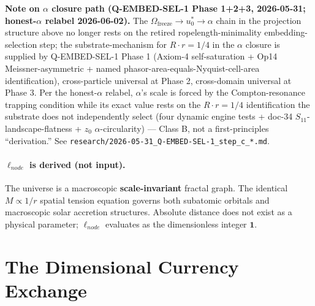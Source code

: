 \medskip
\noindent\textbf{Note on $\alpha$ closure path (Q-EMBED-SEL-1 Phase 1+2+3, 2026-05-31; honest-$\alpha$ relabel 2026-06-02).} The $\Omega_\text{freeze} \to u_0^* \to \alpha$ chain in the projection structure above no longer rests on the retired ropelength-minimality embedding-selection step; the substrate-mechanism for $R \cdot r = 1/4$ in the $\alpha$ closure is supplied by Q-EMBED-SEL-1 Phase 1 (Axiom-4 self-saturation + Op14 Meissner-asymmetric + named phasor-area-equals-Nyquist-cell-area identification), cross-particle universal at Phase 2, cross-domain universal at Phase 3. Per the honest-$\alpha$ relabel, $\alpha$'s scale is forced by the Compton-resonance trapping condition while its exact value rests on the $R \cdot r = 1/4$ identification the substrate does not independently select (four dynamic engine tests + doc-34 $S_{11}$-landscape-flatness + $z_0$ $\alpha$-circularity) --- Class B, not a first-principles ``derivation.'' See \texttt{research/2026-05-31\_Q-EMBED-SEL-1\_step\_c\_*.md}.

\paragraph{$\ell_{node}$ is derived (not input).}
The universe is a macroscopic \textbf{scale-invariant} fractal graph.
The identical $M \propto 1/r$ spatial tension equation governs both subatomic
orbitals and macroscopic solar accretion structures. Absolute distance does not
exist as a physical parameter; $\ell_{node}$ evaluates as the dimensionless
integer $\mathbf{1}$.

\bigskip
\noindent
{}

\section{The Dimensional Currency Exchange}
\label{sec:currency_exchange}


